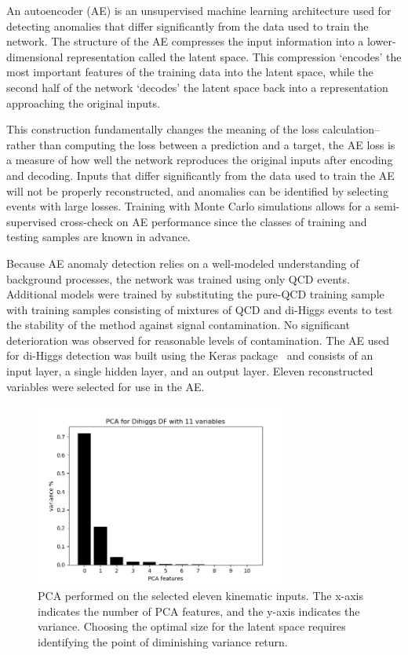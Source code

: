 \label{sec:AE}

An autoencoder (AE) is an unsupervised machine learning architecture used for detecting anomalies that differ significantly from the data used to train the network. The structure of the AE compresses the input information into a lower-dimensional representation called the latent space. This compression `encodes' the most important features of the training data into the latent space, while the second half of the network `decodes' the latent space back into a representation approaching the original inputs.

This construction fundamentally changes the meaning of the loss calculation-- rather than computing the loss between a prediction and a target, the AE loss is a measure of how well the network reproduces the original inputs after encoding and decoding. Inputs that differ significantly from the data used to train the AE will not be properly reconstructed, and anomalies can be identified by selecting events with large losses. Training with Monte Carlo simulations allows for a semi-supervised cross-check on AE performance since the classes of training and testing samples are known in advance.

Because AE anomaly detection relies on a well-modeled understanding of background processes, the network was trained using only QCD events. Additional models were trained by substituting the pure-QCD training sample with training samples consisting of mixtures of QCD and di-Higgs events to test the stability of the method against signal contamination. No significant deterioration was observed for reasonable levels of contamination. The AE used for di-Higgs detection was built using the Keras package~\cite{chollet2015keras} and consists of an input layer, a single hidden layer, and an output layer. Eleven reconstructed variables were selected for use in the AE. 

\begin{figure}[!h] 
\begin{center}
\includegraphics*[width=0.75\textwidth] {AE/figures/ae_PCA_11vars}
\caption{PCA performed on the selected eleven kinematic inputs. The x-axis indicates the number of PCA features, and the y-axis indicates the variance. Choosing the optimal size for the latent space requires identifying the point of diminishing variance return.}
  \label{fig:ae_pca}
\end{center}
\end{figure}

